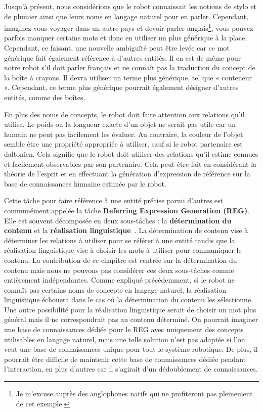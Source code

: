 Jusqu'à présent, nous considérions que le robot connaissait les notions de stylo et de plumier ainsi que leurs noms en langage naturel pour en parler. Cependant, imaginez-vous voyager dans un autre pays et devoir parler anglais\footnote{Je m'excuse auprès des anglophones natifs qui ne profiteront pas pleinement de cet exemple.}, vous pouvez parfois manquer certains mots et donc en utiliser un plus générique à la place. Cependant, ce faisant, une nouvelle ambiguïté peut être levée car ce mot générique fait également référence à d'autres entités. Il en est de même pour notre robot s'il doit parler français et ne connaît pas la traduction du concept de la boîte à crayons. Il devra utiliser un terme plus générique, tel que « conteneur ». Cependant, ce terme plus générique pourrait également désigner d'autres entités, comme des boîtes.

En plus des noms de concepts, le robot doit faire attention aux relations qu'il utilise. Le poids ou la longueur exacte d'un objet ne serait pas utile car un humain ne peut pas facilement les évaluer. Au contraire, la couleur de l'objet semble être une propriété appropriée à utiliser, sauf si le robot partenaire est daltonien. Cela signifie que le robot doit utiliser des relations qu'il estime connues et facilement observables par son partenaire. Cela peut être fait en considérant la théorie de l'esprit et en effectuant la génération d'expression de référence sur la base de connaissances humaine estimée par le robot.

Cette tâche pour faire référence à une entité précise parmi d'autres est communément appelée la tâche \textbf{Referring Expression Generation (REG)}. Elle est souvent décomposée en deux sous-tâches : la \textbf{détermination du contenu} et la \textbf{réalisation linguistique}~\cite{krahmer_2012_computational}. La détermination de contenu vise à déterminer les relations à utiliser pour se référer à une entité tandis que la réalisation linguistique vise à choisir les mots à utiliser pour communiquer le contenu. La contribution de ce chapitre est centrée sur la détermination du contenu mais nous ne pouvons pas considérer ces deux sous-tâches comme entièrement indépendantes. Comme expliqué précédemment, si le robot ne connaît pas certains noms de concepts en langage naturel, la réalisation linguistique échouera dans le cas où la détermination du contenu les sélectionne. Une autre possibilité pour la réalisation linguistique serait de choisir un mot plus général mais il ne correspondrait pas au contenu déterminé. On pourrait imaginer une base de connaissances dédiée pour le REG avec uniquement des concepts utilisables en langage naturel, mais une telle solution n'est pas adaptée si l'on veut une base de connaissances unique pour tout le système robotique. De plus, il pourrait être difficile de maintenir cette base de connaissances dédiée pendant l'interaction, en plus d'autres car il s'agirait d'un dédoublement de connaissances.

